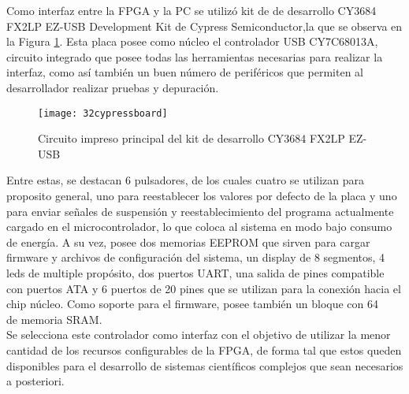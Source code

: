 	Como interfaz entre la FPGA y la PC se utilizó kit de de desarrollo CY3684 FX2LP EZ-USB Development Kit de Cypress Semiconductor,la que se observa en la Figura \ref{cy3684}. Esta placa posee como núcleo el controlador USB CY7C68013A, circuito integrado que posee todas las herramientas necesarias para realizar la interfaz, como así también un buen número de periféricos que permiten al desarrollador realizar pruebas y depuración.\\
	
	\begin{figure}
		\centering
		\texttt{[image: 32cypressboard]}
		\caption{Circuito impreso principal del kit de desarrollo CY3684 FX2LP EZ-USB}
		\label{cy3684}
	\end{figure}
	
	Entre estas, se destacan 6 pulsadores, de los cuales cuatro se utilizan para proposito general, uno para reestablecer los valores por defecto de la placa y uno para enviar señales de suspensión y reestablecimiento del programa actualmente cargado en el microcontrolador, lo que coloca al sistema en modo bajo consumo de energía. A su vez, posee dos memorias EEPROM que sirven para cargar firmware y archivos de configuración del sistema, un display de 8 segmentos, 4 leds de multiple propósito, dos puertos UART, una salida de pines compatible con puertos ATA y 6 puertos de 20 pines que se utilizan para la conexión hacia el chip núcleo. Como soporte para el firmware, posee también un bloque con \SI{64}{\kilo\byte} de memoria SRAM.\\
	
	Se selecciona este controlador como interfaz con el objetivo de utilizar la menor cantidad de los recursos configurables de la FPGA, de forma tal que estos queden disponibles para el desarrollo de sistemas científicos complejos que sean necesarios a posteriori.\\
	